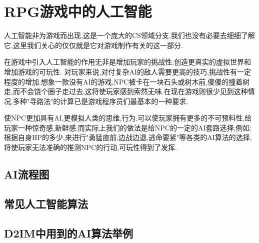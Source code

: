 \chapter{RPG游戏中的人工智能}
人工智能非为游戏而出现,这是一个庞大的CS领域分支.我们也没有必要去细细了解它,这里我们关心的仅仅就是它对游戏制作有关的这一部分.

在游戏中引入人工智能的作用无非是增加玩家的挑战性,创造更真实的虚拟世界和增加游戏的可玩性. 对玩家来说,对付复杂AI的敌人需要更高的技巧,挑战性有一定程度的增加.想象一款没有AI的游戏,NPC被卡在一块石头或树木前,傻傻的撞着树走,而不会饶个圈子走过去,这将使玩家感到索然无味.在现在游戏则很少见到这种情况,多种"寻路法"的计算已是游戏程序员们最基本的一种要求.

使NPC更加具有AI,更模拟人类的思维,行为,可以使玩家拥有更多的不可预料性,给玩家一种惊奇感,新鲜感.而实际上我们的做法是给NPC的一定的AI套路选择,例如:根据自身HP的多少,来进行"勇猛直前,边战边退,逃命要紧"等各类的AI算法的选择,将使玩家无法准确的推测NPC的行动,可玩性得到了发挥.
\newpage
\section{AI流程图}
\section{常见人工智能算法}
\section{D2IM中用到的AI算法举例}
